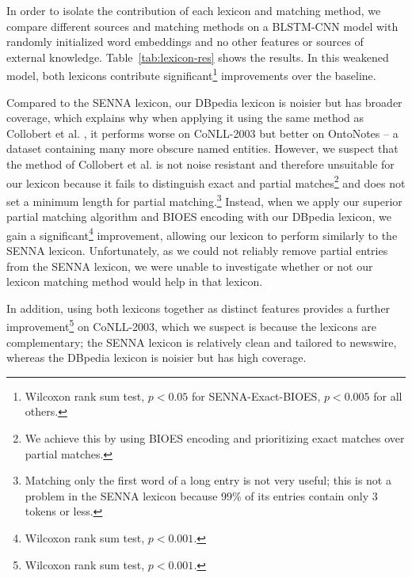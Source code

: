 \documentclass[11pt,letterpaper]{article}
\begin{document}
In order to isolate the contribution of each lexicon and matching method, we compare different sources and matching methods on a BLSTM-CNN model with randomly initialized word embeddings and no other features or sources of external knowledge. Table~\ref{tab:lexicon-res} shows the results. In this weakened model, both lexicons contribute significant\footnote{Wilcoxon rank sum test, $p < 0.05$ for SENNA-Exact-BIOES, $p < 0.005$ for all others.} improvements over the baseline.

Compared to the SENNA lexicon, our DBpedia lexicon is noisier but has broader coverage, which explains why when applying it using the same method as Collobert et al. , it performs worse on CoNLL-2003 but better on OntoNotes -- a dataset containing many more obscure named entities.
However, we suspect that the method of Collobert et al.  is not noise resistant and therefore unsuitable for our lexicon because it fails to distinguish exact and partial matches\footnote{We achieve this by using BIOES encoding and prioritizing exact matches over partial matches.} and does not set a minimum length for partial matching.\footnote{Matching only the first word of a long entry is not very useful; this is not a problem in the SENNA lexicon because 99\% of its entries contain only 3 tokens or less.}
Instead, when we apply our superior partial matching algorithm and BIOES encoding with our DBpedia lexicon, we gain a significant\footnote{Wilcoxon rank sum test, $p < 0.001$.} improvement, allowing our lexicon to perform similarly to the SENNA lexicon. 
Unfortunately, as we could not reliably remove partial entries from the SENNA lexicon, we were unable to investigate whether or not our lexicon matching method would help in that lexicon. 

In addition, using both lexicons together as distinct features provides a further improvement\footnote{Wilcoxon rank sum test, $p < 0.001$.} on CoNLL-2003, which we suspect is because the lexicons are complementary; the SENNA lexicon is relatively clean and tailored to newswire, whereas the DBpedia lexicon is noisier but has high coverage.
\end{document}
